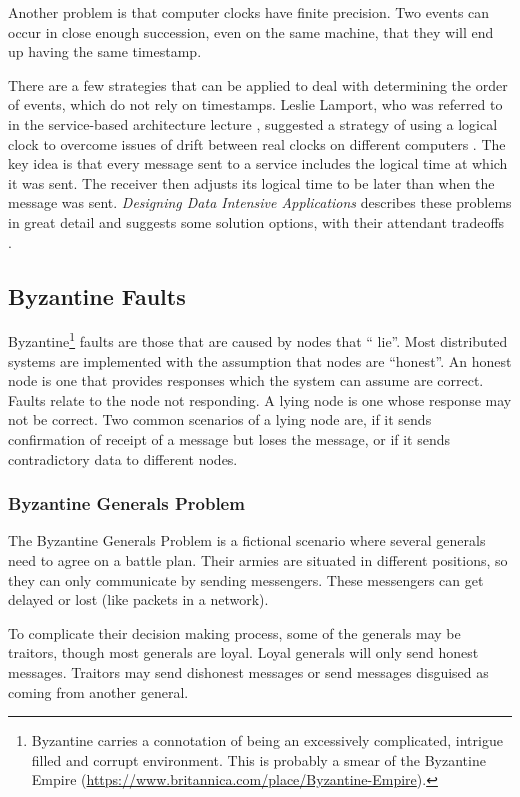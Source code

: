 Another problem is that computer clocks have finite precision.
Two events can occur in close enough succession, even on the same machine, that they will end up having the same timestamp.

There are a few strategies that can be applied to deal with determining the order of events, which do not rely on timestamps.
Leslie Lamport, who was referred to in the service-based architecture lecture \cite{service-based-slides},
suggested a strategy of using a logical clock to overcome issues of drift
between real clocks on different computers \cite{LamportLeslie1978Tcat}.
The key idea is that every message sent to a service includes the logical time at which it was sent.
The receiver then adjusts its logical time to be later than when the message was sent.
\textit{Designing Data Intensive Applications} describes these problems in great detail
and suggests some solution options, with their attendant tradeoffs \cite{data-intensive}.

\subsection{Byzantine Faults}\label{sec:byzantine}

Byzantine\footnote{Byzantine carries a connotation of being an excessively complicated, intrigue filled and corrupt environment.
This is probably a smear of the Byzantine Empire (\url{https://www.britannica.com/place/Byzantine-Empire}).}
faults are those that are caused by nodes that `` lie''.
Most distributed systems are implemented with the assumption that nodes are ``honest''.
An honest node is one that provides responses which the system can assume are correct.
Faults relate to the node not responding.
A lying node is one whose response may not be correct.
Two common scenarios of a lying node are, if it sends confirmation of receipt of a message but loses the message,
or if it sends contradictory data to different nodes.

\subsubsection*{Byzantine Generals Problem}
The Byzantine Generals Problem \cite{byzantine-generals} is a fictional scenario where several generals need to agree on a battle plan.
Their armies are situated in different positions, so they can only communicate by sending messengers.
These messengers can get delayed or lost (like packets in a network).

To complicate their decision making process, some of the generals may be traitors,
though most generals are loyal.
Loyal generals will only send honest messages.
Traitors may send dishonest messages or send messages disguised as coming from another general.

